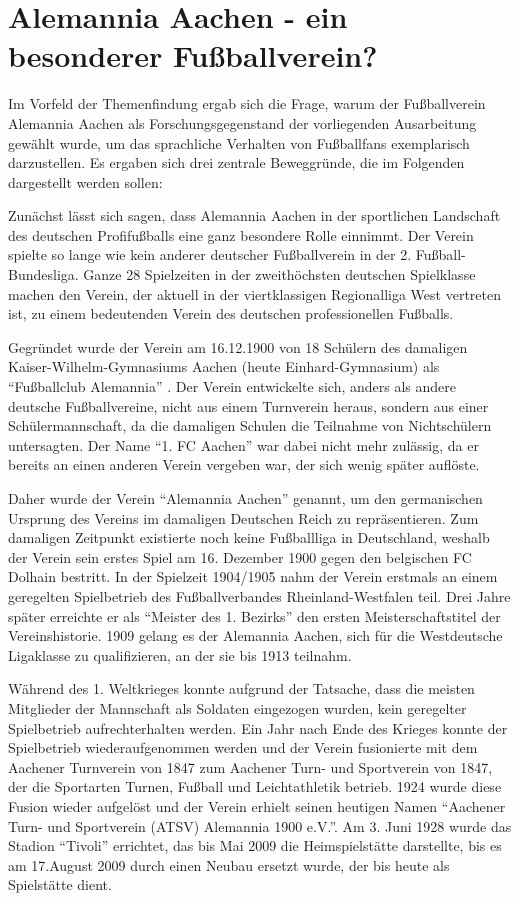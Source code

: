 \section{Alemannia Aachen - ein besonderer Fußballverein?}
Im Vorfeld der Themenfindung ergab sich die Frage, warum der Fußballverein Alemannia Aachen als Forschungsgegenstand der vorliegenden Ausarbeitung gewählt wurde, um das sprachliche
Verhalten von Fußballfans exemplarisch darzustellen.
Es ergaben sich drei zentrale Beweggründe, die im Folgenden dargestellt werden sollen:

Zunächst lässt sich sagen, dass Alemannia Aachen in der sportlichen Landschaft des deutschen Profifußballs eine ganz besondere Rolle einnimmt.
Der Verein spielte so lange wie kein anderer deutscher Fußballverein in der 2. Fußball-Bundesliga.
Ganze 28 Spielzeiten in der zweithöchsten deutschen Spielklasse machen den Verein, der aktuell in der viertklassigen Regionalliga West vertreten ist, zu einem bedeutenden Verein des deutschen professionellen Fußballs.

Gegründet wurde der Verein am 16.12.1900 von 18 Schülern des damaligen Kaiser-Wilhelm-Gymnasiums Aachen (heute Einhard-Gymnasium) als "`Fußballclub Alemannia"' \cite{AA14}.
Der Verein entwickelte sich, anders als andere deutsche Fußballvereine, nicht aus einem Turnverein heraus, sondern aus einer Schülermannschaft, da die damaligen Schulen die Teilnahme von Nichtschülern untersagten.
Der Name "`1. FC Aachen"' war dabei nicht mehr zulässig, da er bereits an einen anderen Verein vergeben war, der sich wenig später auflöste.

Daher wurde der Verein "`Alemannia Aachen"' genannt, um den germanischen Ursprung des Vereins im damaligen Deutschen Reich zu repräsentieren.
Zum damaligen Zeitpunkt existierte noch keine Fußballliga in Deutschland, weshalb der Verein sein erstes Spiel am 16. Dezember 1900 gegen den belgischen FC Dolhain bestritt.
In der Spielzeit 1904/1905 nahm der Verein erstmals an einem geregelten Spielbetrieb des Fußballverbandes Rheinland-Westfalen teil.
Drei Jahre später erreichte er als "`Meister des 1. Bezirks"' den ersten Meisterschaftstitel der Vereinshistorie.
1909 gelang es der Alemannia Aachen, sich für die Westdeutsche Ligaklasse zu qualifizieren, an der sie bis 1913 teilnahm.

Während des 1. Weltkrieges konnte aufgrund der Tatsache, dass die meisten Mitglieder der Mannschaft als Soldaten eingezogen wurden, kein geregelter Spielbetrieb aufrechterhalten werden.
Ein Jahr nach Ende des Krieges konnte der Spielbetrieb wiederaufgenommen werden und der Verein fusionierte mit dem Aachener Turnverein von 1847 zum Aachener Turn- und Sportverein von 1847, der die Sportarten Turnen, Fußball und Leichtathletik betrieb.
1924 wurde diese Fusion wieder aufgelöst und der Verein erhielt seinen heutigen Namen "`Aachener Turn- und Sportverein (ATSV) Alemannia 1900 e.V."'.
Am 3. Juni 1928 wurde das Stadion "`Tivoli"' errichtet, das bis Mai 2009 die Heimspielstätte darstellte, bis es am 17.August 2009 durch einen Neubau ersetzt wurde, der bis heute als Spielstätte dient.

